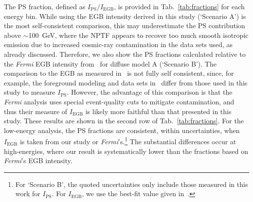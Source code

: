 The PS fraction, defined as $I_\text{PS}/I_\text{EGB}$, is provided in Tab.~\ref{tab:fractions} for each energy bin.  While using the EGB intensity derived in this study (`Scenario A') is the most self-consistent comparison, this may underestimate the PS contribution above $\sim$100~GeV, where the NPTF appears to recover too much smooth isotropic emission due to increased cosmic-ray contamination in the data sets used, as already discussed.  Therefore, we also show the PS fractions calculated relative to the \emph{Fermi} EGB intensity from~\cite{Ackermann:2014usa} for diffuse model A (`Scenario B').  The comparison to the EGB as measured in~\cite{Ackermann:2014usa} is not fully self consistent, since, for example, the foreground modeling and data sets in~\cite{Ackermann:2014usa} differ from those used in this study to measure $I_\text{PS}$.  However, the advantage of this comparison is that the \emph{Fermi} analysis uses special event-quality cuts to mitigate contamination, and thus their measure of $I_\text{EGB}$ is likely more faithful than that presented in this study.  These results are shown in the second row of Tab.~\ref{tab:fractions}.  For the low-energy analysis, the PS fractions are consistent, within uncertainties, when $I_\text{EGB}$ is taken from our study or \emph{Fermi}'s.\footnote{For `Scenario B', the quoted uncertainties only include those measured in this work for $I_\text{PS}$.  For $I_\text{EGB}$, we use the best-fit value given in~\cite{Ackermann:2014usa}.}  The substantial differences occur at high-energies, where our result is systematically lower than the fractions based on \emph{Fermi}'s EGB intensity.  


